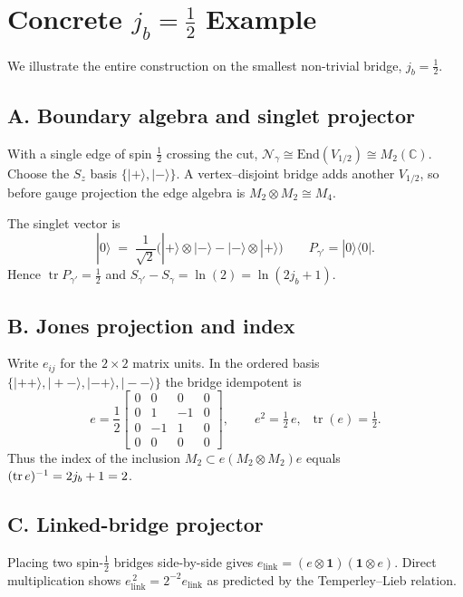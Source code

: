 \documentclass[11pt]{article}
\begin{document}
\section{Concrete $j_b=\tfrac12$ Example}\label{app:example}

We illustrate the entire construction on the smallest non-trivial bridge,
$j_b=\tfrac12$.

\subsection*{A. Boundary algebra and singlet projector}

With a single edge of spin $\tfrac12$ crossing the cut,
$\mathcal N_{\gamma}\cong\mathrm{End}(V_{1/2})\cong M_2(\mathbb C)$.
Choose the $S_z$ basis $\{|+\rangle,|-\rangle\}$.
A vertex–disjoint bridge adds another $V_{1/2}$, so before gauge
projection the edge algebra is $M_2\!\otimes\!M_2\cong M_4$.

The singlet vector is
\[
  |0\rangle \;=\;
  \frac{1}{\sqrt2}\bigl(|+\rangle\!\otimes|-\rangle-
  |-\rangle\!\otimes|+\rangle\bigr)
  \qquad
  P_{\gamma'} = |0\rangle\langle 0|.
\]
Hence $\operatorname{tr}P_{\gamma'}=\tfrac12$ and
$S_{\gamma'}-S_{\gamma}= \ln(2)=\ln(2j_b+1)$.

\subsection*{B. Jones projection and index}

Write $e_{ij}$ for the $2\times2$ matrix units.
In the ordered basis
$\{|+\!+\rangle,|+-\rangle,|-+\rangle,|--\rangle\}$ the
bridge idempotent is
\[
  e=\frac12
  \begin{bmatrix}
    0&0&0&0\\
    0&1&-1&0\\
    0&-1&1&0\\
    0&0&0&0
  \end{bmatrix},
  \qquad
  e^2=\tfrac12\,e,\;\;
  \operatorname{tr}(e)=\tfrac12.
\]
Thus the index of the inclusion
$M_2\subset e(M_2\otimes M_2)e$ equals $({\rm tr}\,e)^{-1}=2j_b+1=2$.

\subsection*{C. Linked-bridge projector}

Placing two spin-$\tfrac12$ bridges side-by-side gives
\(
  e_{\mathrm{link}}=(e\otimes\mathbf1)(\mathbf1\otimes e)
\).
Direct multiplication shows
$e_{\mathrm{link}}^{\,2}=2^{-2}e_{\mathrm{link}}$ as predicted by the
Temperley–Lieb relation.
\end{document}
